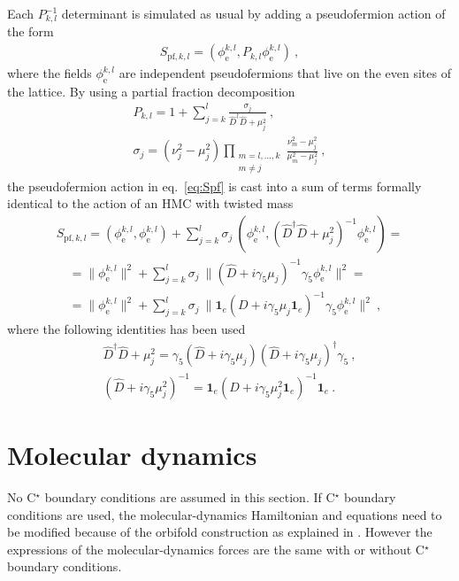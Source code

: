 \documentclass[11pt,fleqn]{article}
\begin{document}
Each $P_{k,l}^{-1}$ determinant is simulated as usual by adding a pseudofermion action of the form
\begin{gather}
   S_{\text{pf},k,l} = ( \phi^{k,l}_\text{e} , P_{k,l} \phi^{k,l}_\text{e} ) \ ,
   \label{eq:Spf}
\end{gather}
where the fields $\phi^{k,l}_\text{e}$ are independent pseudofermions that live on the even sites of the lattice. By using a partial fraction decomposition
\begin{gather}
   P_{k,l}
   =
   1 + \sum_{j=k}^l \frac{\sigma_j}{\hat{D}^\dag \hat{D} + \mu_j^2}
   \ , \\
   \sigma_j = (\nu_j^2 - \mu_j^2) \prod_{\substack{m=l,\dots,k\\m \neq j}} \frac{\nu_m^2-\mu_j^2}{\mu_m^2-\mu_j^2}
   \ ,
\end{gather}
the pseudofermion action in eq.~\eqref{eq:Spf} is cast into a sum of terms formally identical to the action of an HMC with twisted mass
\begin{gather}
   S_{\text{pf},k,l} = ( \phi^{k,l}_\text{e} , \phi^{k,l}_\text{e} ) 
   + \sum_{j=k}^l \sigma_j \ ( \phi^{k,l}_\text{e}, (\hat{D}^\dag \hat{D} + \mu_j^2)^{-1} \phi^{k,l}_\text{e} )
   = \nonumber \\ \quad =
   \| \phi^{k,l}_\text{e} \|^2
   + \sum_{j=k}^l \sigma_j \ \| (\hat{D} + i \gamma_5 \mu_j)^{-1} \gamma_5 \phi^{k,l}_\text{e} \|^2
   = \nonumber \\ \quad =
   \| \phi^{k,l}_\text{e} \|^2
   + \sum_{j=k}^l \sigma_j \ \| \mathbf{1}_e (D + i \gamma_5 \mu_j \mathbf{1}_e)^{-1} \gamma_5 \phi^{k,l}_\text{e} \|^2
   \ ,
   \label{eq:Spf2}
\end{gather}
where the following identities has been used
\begin{gather}
   \hat{D}^\dag \hat{D} + \mu_j^2 = \gamma_5 (\hat{D} + i \gamma_5 \mu_j) (\hat{D} + i \gamma_5 \mu_j)^\dag \gamma_5 \ , \\
   (\hat{D} + i \gamma_5 \mu_j^2)^{-1} = \mathbf{1}_e (D + i \gamma_5 \mu_j^2 \mathbf{1}_e)^{-1} \mathbf{1}_e \ .
\end{gather}



\section{Molecular dynamics}

No C$^\star$ boundary conditions are assumed in this section. If C$^\star$ boundary conditions are used, the molecular-dynamics Hamiltonian and equations need to be modified because of the orbifold construction as explained in \cite{cstar}. However the expressions of the molecular-dynamics forces are the same with or without C$^\star$ boundary conditions.
\end{document}
